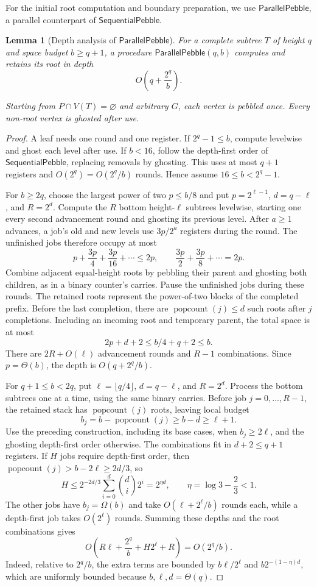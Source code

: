 \documentclass[11pt]{article}
\newtheorem{lemma}[lemma]{Lemma}
\theoremstyle{definition}
\theoremstyle{remark}
\DeclareMathOperator{\popcount}{popcount}
\newcommand{\Fast}{\mathsf{SequentialPebble}}
\newcommand{\Sweep}{\mathsf{ParallelPebble}}
\begin{document}
For the initial root computation and boundary preparation, we use $\Sweep$, a parallel counterpart of $\Fast$.

\begin{lemma}[Depth analysis of $\Sweep$]
\label{lem:sweep}
For a complete subtree $T$ of height $q$ and space budget $b\ge q+1$, a procedure $\Sweep(q,b)$ computes and retains its root in depth
\begin{equation}
O\!\left(q+\frac{2^q}{b}\right).
\label{eq:sweep}
\end{equation}

Starting from $P\cap V(T)=\varnothing$ and arbitrary $G$, each vertex is pebbled once. Every non-root vertex is ghosted after use.

\end{lemma}
\begin{proof}
A leaf needs one round and one register. If $2^q-1\le b$, compute
levelwise and ghost each level after use. If $b<16$, follow the
depth-first order of $\Fast$, replacing removals by ghosting.
This uses at most $q+1$ registers and $O(2^q)=O(2^q/b)$ rounds.
Hence assume $16\le b<2^q-1$.

For $b\ge2q$, choose the largest power of two $p\le b/8$ and put
$p=2^{\ell-1}$, $d=q-\ell$, and $R=2^d$.
Compute the $R$ bottom height-$\ell$ subtrees levelwise, starting
one every second advancement round and ghosting its previous level.
After $a\ge1$ advances, a job's old and new levels use $3p/2^a$
registers during the round. The unfinished jobs therefore occupy at most
\[
p+\frac{3p}{4}+\frac{3p}{16}+\cdots\le2p, \qquad \frac{3p}{2}+\frac{3p}{8}+\cdots=2p.
\]
Combine adjacent equal-height roots by pebbling their parent and
ghosting both children, as in a binary counter's carries. Pause the
unfinished jobs during these rounds. The retained roots represent the
power-of-two blocks of the completed prefix. Before the last completion,
there are $\popcount(j)\le d$ such roots after $j$ completions.
Including an incoming root and temporary parent, the total space is at most
\[
2p+d+2\le b/4+q+2\le b.
\]
There are $2R+O(\ell)$ advancement rounds and $R-1$ combinations.
Since $p=\Theta(b)$, the depth is $O(q+2^q/b)$.

For $q+1\le b<2q$, put $\ell=\lfloor q/4\rfloor$,
$d=q-\ell$, and $R=2^d$. Process the bottom subtrees one at a time,
using the same binary carries. Before job $j=0,\ldots,R-1$, the retained
stack has $\popcount(j)$ roots, leaving local budget
\[
b_j=b-\popcount(j)\ge b-d\ge\ell+1.
\]
Use the preceding construction, including its base cases, when
$b_j\ge2\ell$, and the ghosting depth-first order otherwise.
The combinations fit in $d+2\le q+1$ registers. If $H$ jobs require depth-first order, then
$\popcount(j)>b-2\ell\ge2d/3$, so
\[
H\le2^{-2d/3}\sum_{i=0}^d\binom di2^i=2^{\eta d}, \qquad \eta=\log3-\frac23<1.
\]
The other jobs have $b_j=\Omega(b)$ and take $O(\ell+2^\ell/b)$
rounds each, while a depth-first job takes $O(2^\ell)$ rounds.
Summing these depths and the root combinations gives
\[
O\!\left(R\ell+\frac{2^q}{b}+H2^\ell+R\right)=O(2^q/b).
\]
Indeed, relative to $2^q/b$, the extra terms are bounded by
$b\ell/2^\ell$ and $b2^{-(1-\eta)d}$, which are uniformly bounded
because $b,\ell,d=\Theta(q)$.


\end{proof}
\end{document}
